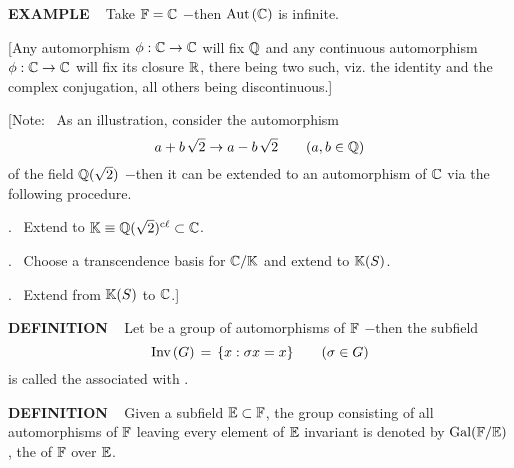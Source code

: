 \vspace{0.1cm}

\begin{x}{\small\bf EXAMPLE} \ %
Take $\mathbb{F} = \mathbb{C}$ $-$then $\text{Aut}\hspace{0.05 cm}(\mathbb{C})$ is infinite.

\vspace{0.1cm}

[Any automorphism $\phi:\mathbb{C} \rightarrow \mathbb{C}$ will fix $\mathbb{Q}$ and any continuous automorphism $\phi:\mathbb{C} \rightarrow \mathbb{C}$ will fix its closure $\mathbb{R}$, 
there being two such, viz. the identity and the complex conjugation, all others being discontinuous.]

\vspace{0.1cm}

[Note: \ As an illustration, consider the automorphism
\[
a +  b \hspace{0.05cm} \sqrt{2} \rightarrow a - b \hspace{0.05cm} \sqrt{2} \qquad (a, b \in \mathbb{Q})
\]
of the field $\mathbb{Q}(\sqrt{2})$ $-$then it can be extended to an automorphism of $\mathbb{C}$ via the following procedure.

\vspace{0.1cm}

\qquad{}. \ Extend to $\mathbb{K} \equiv \mathbb{Q}(\sqrt{2})^{\text{c$\ell$}} \subset \mathbb{C}$.


\vspace{0.1cm}

\qquad{}. \ Choose a transcendence basis \mS for $\mathbb{C}/\mathbb{K}$ and extend to $\mathbb{K}(S)$. 

\vspace{0.1cm}

\qquad{}. \ Extend from $\mathbb{K}(S)$ to $\mathbb{C}$.]

\end{x}

\vspace{0.1cm}

\begin{x}{\small\bf DEFINITION} \ %
Let \mG be a group of automorphisms of $\mathbb{F}$ $-$then the subfield 
\[
\text{Inv}\hspace{0.05cm}(G) \hspace{0.05cm} = \hspace{0.05cm} \{x: \sigma x = x\} \qquad (\sigma \in G)
\]
is called the 
associated with \mG.
\end{x}

\vspace{0.1cm}

\begin{x}{\small\bf DEFINITION} \ %
Given a subfield $\mathbb{E} \subset \mathbb{F}$, the group consisting of all automorphisms of $\mathbb{F}$ leaving every element of $\mathbb{E}$ invariant is 
denoted by $\text{Gal}(\mathbb{F}/\mathbb{E})$, the 
of $\mathbb{F}$ over $\mathbb{E}$.
\end{x}

